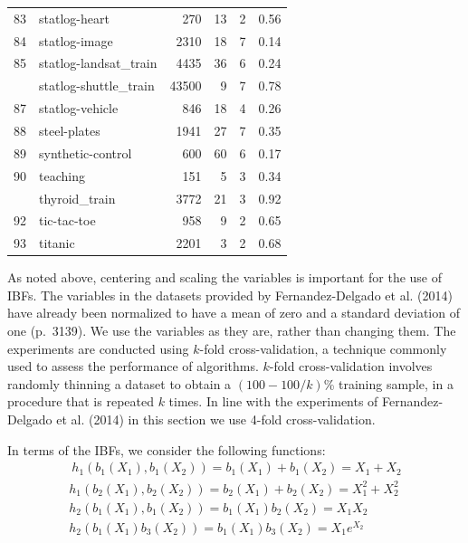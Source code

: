 \documentclass[]{elsarticle} %
\begin{document}
\begin{longtable}[t]{rlrrrr}
83 & statlog-heart & 270 & 13 & 2 & 0.56\\
84 & statlog-image & 2310 & 18 & 7 & 0.14\\
85 & statlog-landsat\_train & 4435 & 36 & 6 & 0.24\\
\addlinespace
86 & statlog-shuttle\_train & 43500 & 9 & 7 & 0.78\\
87 & statlog-vehicle & 846 & 18 & 4 & 0.26\\
88 & steel-plates & 1941 & 27 & 7 & 0.35\\
89 & synthetic-control & 600 & 60 & 6 & 0.17\\
90 & teaching & 151 & 5 & 3 & 0.34\\
\addlinespace
91 & thyroid\_train & 3772 & 21 & 3 & 0.92\\
92 & tic-tac-toe & 958 & 9 & 2 & 0.65\\
93 & titanic & 2201 & 3 & 2 & 0.68\\*
\end{longtable}

As noted above, centering and scaling the variables is important for the
use of IBFs. The variables in the datasets provided by Fernandez-Delgado
et al. (2014) have already been normalized to have a mean of zero and a
standard deviation of one (p.~3139). We use the variables as they are,
rather than changing them. The experiments are conducted using
\(k\)-fold cross-validation, a technique commonly used to assess the
performance of algorithms. \(k\)-fold cross-validation involves randomly
thinning a dataset to obtain a \((100 - 100/k)\)\% training sample, in a
procedure that is repeated \(k\) times. In line with the experiments of
Fernandez-Delgado et al. (2014) in this section we use 4-fold
cross-validation.

In terms of the IBFs, we consider the following functions: \[
\begin{array}{c}\
h_1(b_1(X_1),b_1(X_2))=b_1(X_1)+b_1(X_2)=X_1+X_2\\
h_1(b_2(X_1),b_2(X_2))=b_2(X_1)+b_2(X_2)=X_1^2+X_2^2\\
h_2(b_1(X_1),b_1(X_2))=b_1(X_1)b_2(X_2)=X_1X_2\\
h_2(b_1(X_1)b_3(X_2))=b_1(X_1)b_3(X_2)=X_1e^{X_2}
\end{array}
\]
\end{document}
